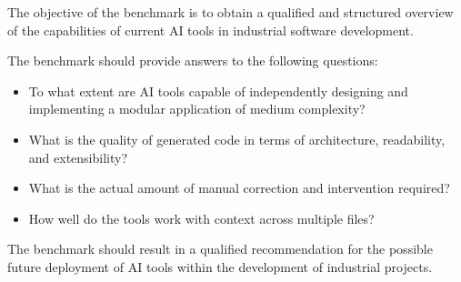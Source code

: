 \documentclass[12pt,a4paper]{article}
\begin{document}
The objective of the benchmark is to obtain a qualified and structured overview
of the capabilities of current AI tools in industrial software development.

The benchmark should provide answers to the following questions:

\begin{itemize}
    \item To what extent are AI tools capable of independently designing
    and implementing a modular application of medium complexity?
    \item What is the quality of generated code in terms of architecture,
    readability, and extensibility?
    \item What is the actual amount of manual correction and intervention required?
    \item How well do the tools work with context across multiple files?
\end{itemize}

The benchmark should result in a qualified recommendation
for the possible future deployment of AI tools within
the development of industrial projects.
\end{document}
